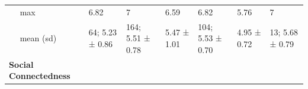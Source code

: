 \documentclass[
  english,
  man,floatsintext]{apa6}
\begin{document}
\begin{longtable}[]{@{}lllllll@{}}
\begin{minipage}[t]{0.14\columnwidth}\raggedright
~~ max\strut
\end{minipage} & \begin{minipage}[t]{0.11\columnwidth}\raggedright
6.82\strut
\end{minipage} & \begin{minipage}[t]{0.12\columnwidth}\raggedright
7\strut
\end{minipage} & \begin{minipage}[t]{0.10\columnwidth}\raggedright
6.59\strut
\end{minipage} & \begin{minipage}[t]{0.12\columnwidth}\raggedright
6.82\strut
\end{minipage} & \begin{minipage}[t]{0.10\columnwidth}\raggedright
5.76\strut
\end{minipage} & \begin{minipage}[t]{0.11\columnwidth}\raggedright
7\strut
\end{minipage}\tabularnewline
\begin{minipage}[t]{0.14\columnwidth}\raggedright
~~ mean (sd)\strut
\end{minipage} & \begin{minipage}[t]{0.11\columnwidth}\raggedright
64; 5.23 ± 0.86\strut
\end{minipage} & \begin{minipage}[t]{0.12\columnwidth}\raggedright
164; 5.51 ± 0.78\strut
\end{minipage} & \begin{minipage}[t]{0.10\columnwidth}\raggedright
5.47 ± 1.01\strut
\end{minipage} & \begin{minipage}[t]{0.12\columnwidth}\raggedright
104; 5.53 ± 0.70\strut
\end{minipage} & \begin{minipage}[t]{0.10\columnwidth}\raggedright
4.95 ± 0.72\strut
\end{minipage} & \begin{minipage}[t]{0.11\columnwidth}\raggedright
13; 5.68 ± 0.79\strut
\end{minipage}\tabularnewline
\begin{minipage}[t]{0.14\columnwidth}\raggedright
\textbf{Social Connectedness}\strut
\end{minipage} & \begin{minipage}[t]{0.11\columnwidth}\raggedright
~~\strut
\end{minipage} & \begin{minipage}[t]{0.12\columnwidth}\raggedright

\end{minipage}
\end{longtable}
\end{document}

